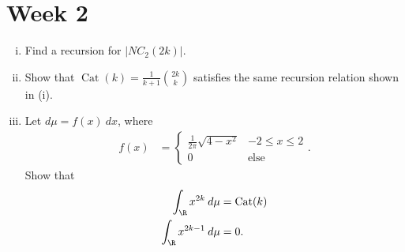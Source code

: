 \documentclass[10pt]{mypackage}
\begin{document}
\section{Week 2}%
\begin{problem}[Exercise 2.23]\hfill
  \begin{enumerate}[(i)]
    \item Find a recursion for $\left\vert NC_2\left( 2k \right) \right\vert$.
    \item Show that $\operatorname{Cat}\left( k \right) = \frac{1}{k+1} {2k\choose k}$ satisfies the same recursion relation shown in (i).
    \item Let $d\mu = f(x)\:dx$, where
      \begin{align*}
        f(x) &= \begin{cases}
          \frac{1}{2\pi}\sqrt{4-x^2} & -2\leq x \leq 2\\
          0 & \text{else}
        \end{cases}.
      \end{align*}
      Show that
      \begin{align*}
        \int_{\R}^{} x^{2k}\:d\mu &= \operatorname{Cat}(k)\\
        \int_{\R}^{} x^{2k-1}\:d\mu &= 0.
      \end{align*}
  \end{enumerate}
\end{problem}
\end{document}
